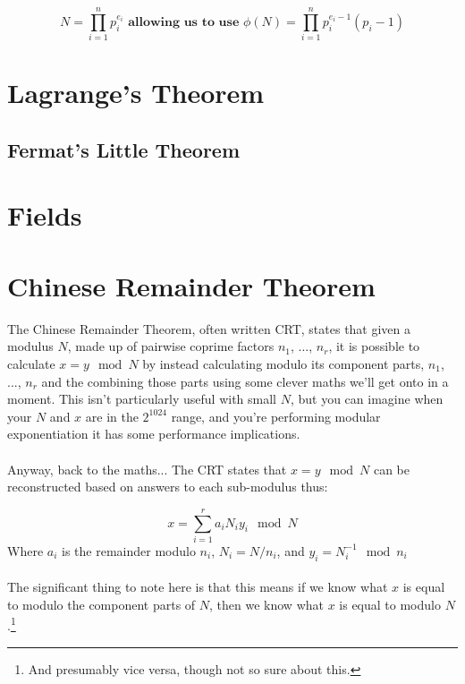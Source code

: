     $$N = \prod_{i=1}^{n}p_{i}^{e_{i}} \textbf{ allowing us to use } \phi(N) = \prod_{i=1}^{n}p_{i}^{e_{i}-1}(p_{i} - 1)$$


    \section{Lagrange's Theorem}
    
        \subsection{Fermat's Little Theorem}
        
    \section{Fields}
    
    \section{Chinese Remainder Theorem}
        The Chinese Remainder Theorem, often written CRT, states that given a modulus $N$, made up of pairwise coprime factors $n_1$, ..., $n_r$, it is possible to calculate $x = y \mod N$ by instead calculating modulo its component parts, $n_1$, ..., $n_r$ and the combining those parts using some clever maths we'll get onto in a moment. This isn't particularly useful with small $N$, but you can imagine when your $N$ and $x$ are in the $2^{1024}$ range, and you're performing modular exponentiation it has some performance implications.\\
        \\
        Anyway, back to the maths... The CRT states that $x = y \mod N$ can be reconstructed based on answers to each sub-modulus thus:

        $$ x = \sum\limits_{i=1}^{r} a_i N_i y_i \mod N $$
        Where $a_i$ is the remainder modulo $n_i$, $N_i = N/n_i$, and $y_i = N_i^{-1} \mod n_i$\\
        \\
        The significant thing to note here is that this means if we know what $x$ is equal to modulo the component parts of $N$, then we know what $x$ is equal to modulo $N$.\footnote{And presumably vice versa, though not so sure about this.}

    

